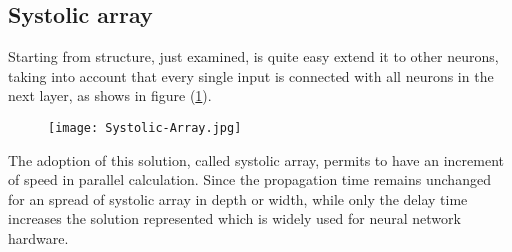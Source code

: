 \subsection{Systolic array}
\label{ssec:hard-systolic-array}
Starting from structure, just examined, is quite easy extend it to other
neurons, taking into account that every single input is connected with all
neurons in the next layer, as shows in figure
(\ref{fig:systolic-array-edge-tpu}).
%
\begin{figure}[htb]
	\centering
	\texttt{[image: Systolic-Array.jpg]}
	\label{fig:systolic-array-edge-tpu}
\end{figure}
%
%
The adoption of this solution, called systolic array, permits to have an
increment of speed in parallel calculation. 
Since the propagation time remains unchanged for an spread of systolic array in
depth or width, while only the delay time increases the solution represented
which is widely used for neural network hardware. 
%
%
%
